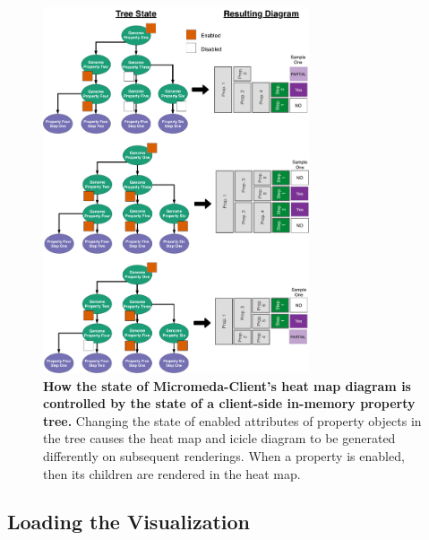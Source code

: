 \begin{figure}[!ht]
  \centering
	\includegraphics[width=0.7\textwidth]{media/how_tree_state_maps.pdf}
	 \caption[How the state of Micromeda-Client's heat map diagram is controlled by 
the state of a client-side in-memory property tree.]{\textbf{How the state of 
Micromeda-Client's heat map diagram is controlled by the state of a client-side 
in-memory property tree.} Changing the state of enabled attributes of property 
objects in the tree causes the heat map and icicle diagram to be generated 
differently on subsequent renderings. When a property is enabled, then its 
children are rendered in the heat map.}
	 \label{fig:tree-map-to-viz}
\end{figure}

\subsection{Loading the Visualization}

